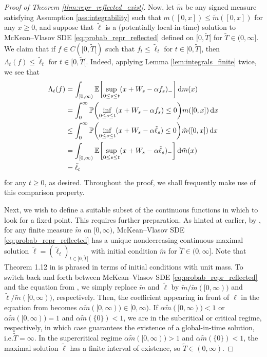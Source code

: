 \documentclass[11pt, a4paper]{article}
\theoremstyle{plain}
\theoremstyle{definition}
\theoremstyle{remark}
\numberwithin{equation}{section}
\newcommand{\ev}{\mathbb{E}}
\newcommand{\pr}{\mathbb{P}}
\renewcommand{\d}{\mathrm{d}}
\begin{document}
\begin{proof}[Proof of Theorem \ref{thm:repr_reflected_exist}]
Now, let $\tilde{m}$ be any signed measure satisfying Assumption \ref{ass:integrability} such that $m([0, x]) \leq \tilde{m}([0, x])$ for any $x \geq 0$, and suppose that $\tilde{\ell}$ is a (potentially local-in-time) solution to McKean--Vlasov SDE \eqref{eq:probab_repr_reflected} defined on $[0, \tilde{T}[$ for $\tilde{T} \in (0, \infty]$. We claim that if $f \in C([0, \tilde{T}[)$ such that $f_t \leq \tilde{\ell}_t$ for $t \in [0, \tilde{T}[$, then $\Lambda_t(f) \leq \tilde{\ell}_t$ for $t \in [0, \tilde{T}[$. Indeed, applying Lemma \ref{lem:integrals_finite} twice, we see that
\begin{align} \label{eq:sol_comparison}
    \Lambda_t(f) &= \int_{[0, \infty)} \ev\biggl[\sup_{0 \leq s \leq t} (x + W_s - \alpha f_s)_-\biggr] \, \d m(x) \notag \\
    &= \int_0^{\infty} \pr\biggl(\inf_{0 \leq s \leq t} (x + W_s - \alpha f_s) \leq 0\biggr) m([0, x]) \, \d x \notag \\
    &\leq \int_0^{\infty} \pr\biggl(\inf_{0 \leq s \leq t} (x + W_s - \alpha \tilde{\ell}_s) \leq 0\biggr) \tilde{m}([0, x]) \, \d x \notag \\
    &= \int_{[0, \infty)} \ev\biggl[\sup_{0 \leq s \leq t} (x + W_s - \alpha \tilde{\ell}_s)_-\biggr] \, \d \tilde{m}(x) \notag \\
    &= \tilde{\ell}_t
\end{align}
for any $t \geq 0$, as desired. Throughout the proof, we shall frequently make use of this comparison property.

Next, we wish to define a suitable subset of the continuous functions in which to look for a fixed point. This requires further preparation. As hinted at earlier, by \cite[Theorem 1.12]{baker_loc_times_2025}, for any finite measure $\tilde{m}$ on $[0, \infty)$, McKean--Vlasov SDE \eqref{eq:probab_repr_reflected} has a unique nondecreasing continuous maximal solution $\tilde{\ell} = (\tilde{\ell}_t)_{t \in [0, \tilde{T}[}$ with initial condition $\tilde{m}$ for $\tilde{T} \in (0, \infty]$. Note that Theorem 1.12 in \cite{baker_loc_times_2025} is phrased in terms of initial conditions with unit mass. To switch back and forth between McKean--Vlasov SDE \eqref{eq:probab_repr_reflected} and the equation from \cite[Theorem 1.12]{baker_loc_times_2025}, we simply replace $\tilde{m}$ and $\tilde{\ell}$ by $\tilde{m}/\tilde{m}([0, \infty))$ and $\tilde{\ell}/\tilde{m}([0, \infty))$, respectively. Then, the coefficient appearing in front of $\ell$ in the equation from \cite{baker_loc_times_2025} becomes $\alpha \tilde{m}([0, \infty)) \in [0, \infty)$. If $\alpha \tilde{m}([0, \infty)) < 1$ or $\alpha \tilde{m}([0, \infty)) = 1$ and $\alpha \tilde{m}(\{0\}) < 1$, we are in the subcritical or critical regime, respectively, in which case \cite[Theorem 1.12]{baker_loc_times_2025} guarantees the existence of a global-in-time solution, i.e.\@ $\tilde{T} = \infty$. In the supercritical regime $\alpha \tilde{m}([0, \infty)) > 1$ and $\alpha \tilde{m}(\{0\}) < 1$, the maximal solution $\tilde{\ell}$ has a finite interval of existence, so $\tilde{T} \in (0, \infty)$.


\end{proof}
\end{document}
